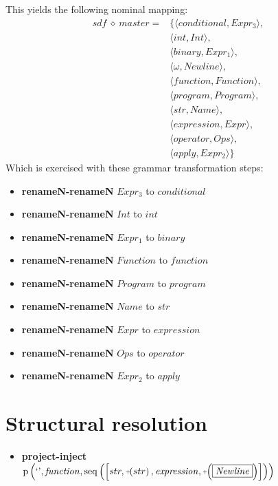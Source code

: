 This yields the following nominal mapping:
\begin{align*}\mathit{sdf} \:\diamond\: \mathit{master} =& \{\langle \mathit{conditional},\mathit{Expr_3}\rangle,\\
 & \langle int,\mathit{Int}\rangle,\\
 & \langle \mathit{binary},\mathit{Expr_1}\rangle,\\
 & \langle \omega,\mathit{Newline}\rangle,\\
 & \langle \mathit{function},\mathit{Function}\rangle,\\
 & \langle \mathit{program},\mathit{Program}\rangle,\\
 & \langle str,\mathit{Name}\rangle,\\
 & \langle \mathit{expression},\mathit{Expr}\rangle,\\
 & \langle \mathit{operator},\mathit{Ops}\rangle,\\
 & \langle \mathit{apply},\mathit{Expr_2}\rangle\}\end{align*}
 Which is exercised with these grammar transformation steps:

{\footnotesize\begin{itemize}
\item \textbf{renameN-renameN} $\mathit{Expr_3}$ to $\mathit{conditional}$
\item \textbf{renameN-renameN} $\mathit{Int}$ to $int$
\item \textbf{renameN-renameN} $\mathit{Expr_1}$ to $\mathit{binary}$
\item \textbf{renameN-renameN} $\mathit{Function}$ to $\mathit{function}$
\item \textbf{renameN-renameN} $\mathit{Program}$ to $\mathit{program}$
\item \textbf{renameN-renameN} $\mathit{Name}$ to $str$
\item \textbf{renameN-renameN} $\mathit{Expr}$ to $\mathit{expression}$
\item \textbf{renameN-renameN} $\mathit{Ops}$ to $\mathit{operator}$
\item \textbf{renameN-renameN} $\mathit{Expr_2}$ to $\mathit{apply}$
\end{itemize}}

\section{Structural resolution}
{\footnotesize\begin{itemize}
\item \textbf{project-inject}\\$\mathrm{p}\left(\text{`'},\mathit{function},\mathrm{seq}\left(\left[str, \plus \left(str\right), \mathit{expression}, \plus \left(\fbox{$\mathit{Newline}$}\right)\right]\right)\right)$
\end{itemize}}
